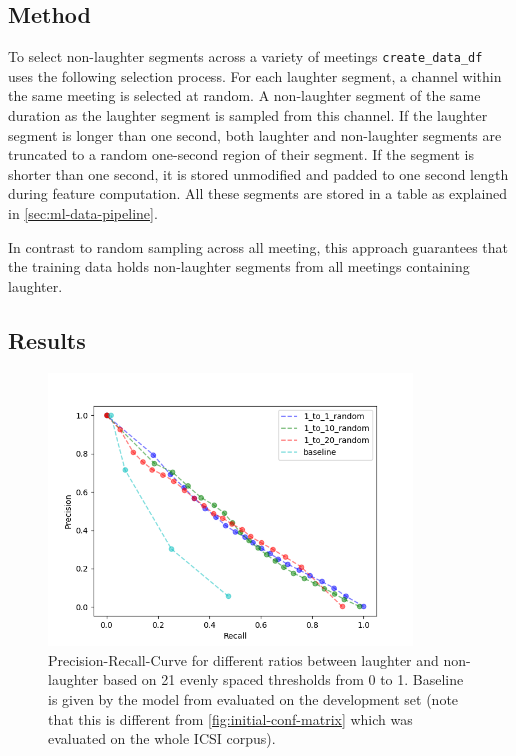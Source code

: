 \documentclass[bsc,frontabs,parskip,deptreport]{infthesis}
\begin{document}

\subsection{Method}
To select non-laughter segments across a variety of meetings \verb|create_data_df| uses the following selection process.
For each laughter segment, a channel within the same meeting is selected at random.
A non-laughter segment of the same duration as the laughter segment is sampled from this channel.
If the laughter segment is longer than one second, both laughter and non-laughter segments are truncated to a random one-second region of their segment. 
If the segment is shorter than one second, it is stored unmodified and padded to one second length during feature computation.
All these segments are stored in a table as explained in \autoref{sec:ml-data-pipeline}.

In contrast to random sampling across all meeting, this approach guarantees that the training data holds non-laughter segments from all meetings containing laughter. 
\subsection{Results} \label{sec:exp1-res}

\begin{figure}[h!]
    \centering
    \includegraphics[width = 3.8in]{imgs/prec-recall/random/dev_compare_class_balance_dev_set.png}
    \caption{Precision-Recall-Curve for different ratios between laughter and non-laughter based on 21 evenly spaced thresholds from 0 to 1. Baseline is given by the model from \citet{gillick2021robust} evaluated on the development set (note that this is different from \autoref{fig:initial-conf-matrix} which was evaluated on the whole ICSI corpus).}
    \label{fig:prec-recall-rand}
\end{figure}
\end{document}

